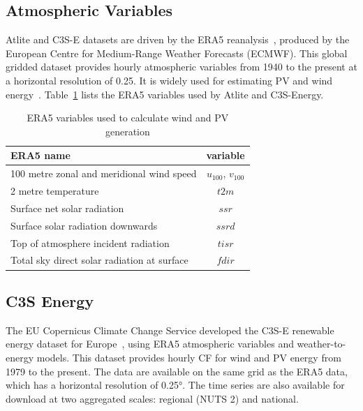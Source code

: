 \documentclass[a4paper, 11p1t]{article}
\begin{document}
\subsection{Atmospheric Variables}
\label{sec:era5}
 
Atlite and C3S-E datasets are driven by the ERA5 reanalysis~\cite{hersbach2020era5}, produced by the European Centre for Medium-Range Weather Forecasts (ECMWF). This global gridded dataset provides hourly atmospheric variables from 1940 to the present at a horizontal resolution of 0.25\textdegree. It is widely used for estimating PV and wind energy~\cite{mockert2023drought, dubus2023energy, brown2021drought, otero2022drought}. Table~\ref{tab:var_name} lists the ERA5 variables used by Atlite and C3S-Energy.

\begin{table}[h!]
	\centering
	\caption{ERA5 variables used to calculate wind and PV generation}
	\begin{tabular}{|l|c|}
		\hline
		{\textbf{ERA5 name}}      & \textbf{variable} \\ \hline
		100 metre zonal and meridional wind speed   & $u_{100}$, $v_{100}$ \\
		2 metre temperature                         & $t2m$ \\
		Surface net solar radiation                 & $ssr$ \\
		Surface solar radiation downwards           & $ssrd$  \\
		Top of atmosphere incident radiation        & $tisr$  \\
		Total sky direct solar radiation at surface & $fdir$  \\ \hline
	\end{tabular}
	\label{tab:var_name}
\end{table}

\subsection{C3S Energy}
\label{sec:c3se}

The EU Copernicus Climate Change Service developed the C3S-E renewable energy dataset for Europe~\cite{dubus2023energy}, using ERA5 atmospheric variables and weather-to-energy models. This dataset provides hourly CF for wind and PV energy from 1979 to the present. The data are available on the same grid as the ERA5 data, which has a horizontal resolution of 0.25°. The time series are also available for download at two aggregated scales: regional (NUTS 2) and national.
\end{document}
